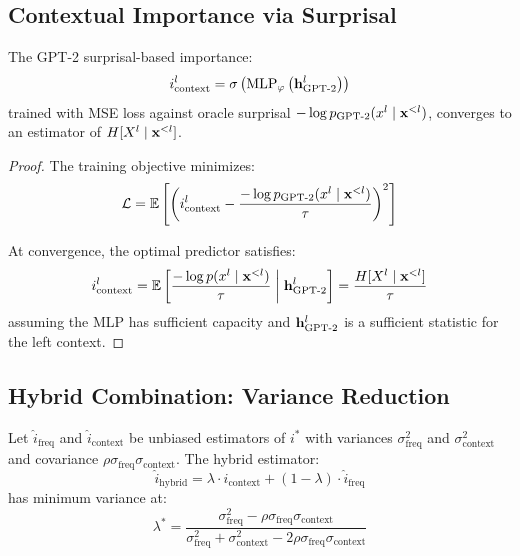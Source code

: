 \subsection{Contextual Importance via Surprisal}

\begin{proposition}
The GPT-2 surprisal-based importance:
\begin{equation}
    i^l_{\text{context}} = \sigma\left(\text{MLP}_\varphi\left(\mathbf{h}^l_{\text{GPT-2}}\right)\right)
\end{equation}
trained with MSE loss against oracle surprisal $-\log p_{\text{GPT-2}}(x^l \mid \mathbf{x}^{<l})$, converges to an estimator of $H[X^l \mid \mathbf{x}^{<l}]$.
\end{proposition}

\begin{proof}
The training objective minimizes:
\begin{equation}
    \mathcal{L} = \mathbb{E}\left[\left(i^l_{\text{context}} - \frac{-\log p_{\text{GPT-2}}(x^l \mid \mathbf{x}^{<l})}{\tau}\right)^2\right]
\end{equation}

At convergence, the optimal predictor satisfies:
\begin{equation}
    i^l_{\text{context}} = \mathbb{E}\left[\frac{-\log p(x^l \mid \mathbf{x}^{<l})}{\tau} \;\middle|\; \mathbf{h}^l_{\text{GPT-2}}\right] = \frac{H[X^l \mid \mathbf{x}^{<l}]}{\tau}
\end{equation}
assuming the MLP has sufficient capacity and $\mathbf{h}^l_{\text{GPT-2}}$ is a sufficient statistic for the left context.
\end{proof}

\subsection{Hybrid Combination: Variance Reduction}

\begin{theorem}
\label{thm:hybrid-variance}
Let $\hat{i}_{\text{freq}}$ and $\hat{i}_{\text{context}}$ be unbiased estimators of $i^*$ with variances $\sigma^2_{\text{freq}}$ and $\sigma^2_{\text{context}}$ and covariance $\rho \sigma_{\text{freq}} \sigma_{\text{context}}$. The hybrid estimator:
\begin{equation}
    \hat{i}_{\text{hybrid}} = \lambda \cdot \hat{i}_{\text{context}} + (1{-}\lambda) \cdot \hat{i}_{\text{freq}}
\end{equation}
has minimum variance at:
\begin{equation}
    \lambda^* = \frac{\sigma^2_{\text{freq}} - \rho \sigma_{\text{freq}} \sigma_{\text{context}}}{\sigma^2_{\text{freq}} + \sigma^2_{\text{context}} - 2\rho \sigma_{\text{freq}} \sigma_{\text{context}}}
\end{equation}
\end{theorem}

